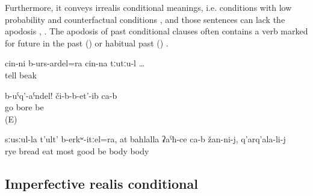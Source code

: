 Furthermore, it conveys irrealis conditional meanings, i.e. conditions with low probability and counterfactual conditions , and those sentences can lack the apodosis , . The apodosis of past conditional clauses often contains a verb marked for future in the past () or habitual past () .
%
\begin{exe}
	\ex	\label{ex:‎if he would have said it with his own mouth}
	\gll	cin-ni	b-urs-ardel=ra	cin-na	tːutːu-l	\ldots\\
			tell		beak\\
	\glt	{}

	\ex	\label{ex:‎‎‎If they would go! They bore (me)}
	\gll	b-uˁq'-aˁndel!	či-b-b-et'-ib	ca-b\\
		go	bore	be\\
	\glt	{} (E)

	\ex	\label{ex:if (you) would eat bread made of rye, it is the best thing for you}
	\gll	sːusːul-la	t'ult'	b-erkʷ-itːel=ra,	at	bahlalla	ʡaˁħ-ce	ca-b	žan-ni-j,	q'arq'ala-li-j\\
		rye	bread	eat		most	good	be	body\tsc{-obl-dat}	body\\
	\glt	{}
\end{exe} 



\subsection{Imperfective realis conditional}
\label{sec:imperfectiverealisconditional}

